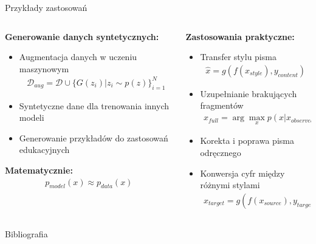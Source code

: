 \documentclass{beamer}
\begin{document}
\begin{frame}{Przykłady zastosowań}
  \begin{columns}
    \begin{column}{0.5\textwidth}
      \textbf{Generowanie danych syntetycznych:}
      \begin{itemize}
        \item Augmentacja danych w uczeniu maszynowym
        \begin{align*}
          \mathcal{D}_{aug} = \mathcal{D} \cup \{G(z_i) | z_i \sim p(z)\}_{i=1}^N
        \end{align*}
        \item Syntetyczne dane dla trenowania innych modeli
        \item Generowanie przykładów do zastosowań edukacyjnych
      \end{itemize}
      
      \textbf{Matematycznie:}
      \begin{align*}
        p_{model}(x) \approx p_{data}(x)
      \end{align*}
    \end{column}
    \begin{column}{0.5\textwidth}
      \textbf{Zastosowania praktyczne:}
      \begin{itemize}
        \item Transfer stylu pisma
        \begin{align*}
          \hat{x} = g(f(x_{style}), y_{content})
        \end{align*}
        \item Uzupełnianie brakujących fragmentów
        \begin{align*}
          \hat{x}_{full} = \arg\max_x p(x | x_{observed})
        \end{align*}
        \item Korekta i poprawa pisma odręcznego
        \item Konwersja cyfr między różnymi stylami
        \begin{align*}
          x_{target} = g(f(x_{source}), y_{target})
        \end{align*}
      \end{itemize}
    \end{column}
  \end{columns}
\end{frame}


\begin{frame}[allowframebreaks]{Bibliografia}
  \printbibliography
\end{frame}
\end{document}
